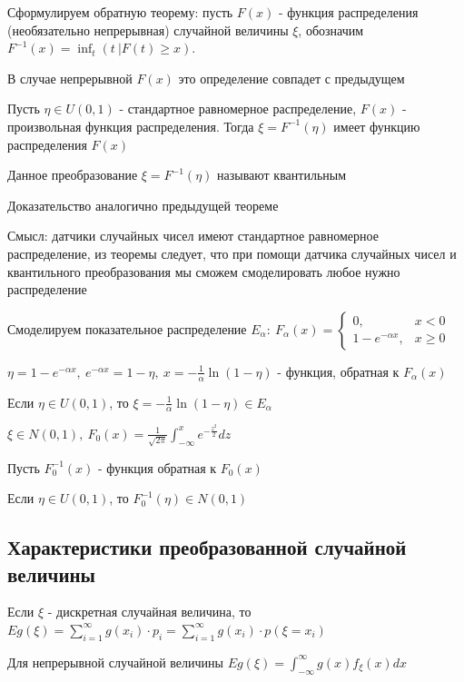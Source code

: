\documentclass[12pt]{article}
\begin{document}
    Сформулируем обратную теорему: пусть $F(x)$ - функция распределения (необязательно непрерывная) случайной величины $\xi$,
    обозначим $F^{-1}(x) = \inf_t (t \ | F(t) \geq x)$.

    В случае непрерывной $F(x)$ это определение совпадет с предыдущем

    \begin{MyTheorem}
         Пусть $\eta \in U(0, 1)$ - стандартное равномерное распределение, $F(x)$ - произвольная функция распределения. 
        Тогда $\xi = F^{-1}(\eta)$ имеет функцию распределения $F(x)$
    \end{MyTheorem}

    Данное преобразование $\xi = F^{-1}(\eta)$ называют квантильным

    Доказательство аналогично предыдущей теореме
    
    Смысл: датчики случайных чисел имеют стандартное равномерное распределение, из теоремы следует, что при помощи
    датчика случайных чисел и квантильного преобразования мы сможем смоделировать любое нужно распределение

     Смоделируем показательное распределение $E_\alpha: \ F_\alpha(x) = \begin{cases}0, & x < 0 \\ 1 - e^{-\alpha x}, & x \geq 0\end{cases}$

    $\eta = 1 - e^{-\alpha x}, \ e^{-\alpha x} = 1 - \eta, \ x = -\frac{1}{\alpha} \ln(1 - \eta)$ - функция, обратная к $F_\alpha(x)$

    Если $\eta \in U(0, 1)$, то $\xi = -\frac{1}{\alpha} \ln(1 - \eta) \in E_\alpha$

     $\xi \in N(0, 1), \ F_0(x) = \frac{1}{\sqrt{2\pi}} \int_{-\infty}^x e^{-\frac{z^2}{2}} dz$

    Пусть $F_0^{-1}(x)$ - функция обратная к $F_0(x)$

    Если $\eta \in U(0, 1)$, то $F_0^{-1}(\eta) \in N(0, 1)$

    \subsection{Характеристики преобразованной случайной величины}

    \hypertarget{expectedvalueoftransformedvariable}{}

    \begin{MyTheorem}
        \Ths Если $\xi$ - дискретная случайная величина, то $Eg(\xi) = \sum_{i = 1}^\infty g(x_i) \cdot p_i = \sum_{i = 1}^\infty g(x_i) \cdot p(\xi = x_i)$

        Для непрерывной случайной величины $Eg(\xi) = \int_{-\infty}^{\infty} g(x) f_\xi(x) dx$
    \end{MyTheorem}
\end{document}
